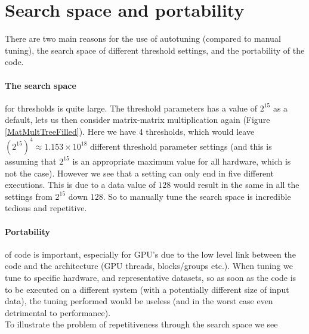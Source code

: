 \section{Search space and portability}
There are two main reasons for the use of autotuning (compared to manual tuning), the search space of different threshold settings, and the portability of the code.
\paragraph{The search space} for thresholds is quite large. The threshold parameters has a value of $2^{15}$ as a default, lets us then consider matrix-matrix multiplication again (Figure \ref{MatMultTreeFilled}). Here we have 4 thresholds, which would leave $\left(2^{15}\right)^4 \approx 1.153\times10^{18}$ different threshold parameter settings (and this is assuming that $2^{15}$ is an appropriate maximum value for all hardware, which is not the case). However we see that a setting can only end in five different executions. This is due to a data value of $128$ would result in the same in all the settings from $2^{15}$ down $128$. So to manually tune the search space is incredible tedious and repetitive.
\paragraph{Portability} of code is important, especially for GPU's due to the low level link between the code and the architecture (GPU threads, blocks/groups etc.). When tuning we tune to specific hardware, and representative datasets, so as soon as the code is to be executed on a different system (with a potentially different size of input data), the tuning performed would be useless (and in the worst case even detrimental to performance).\\

To illustrate the problem of repetitiveness through the search space we see 